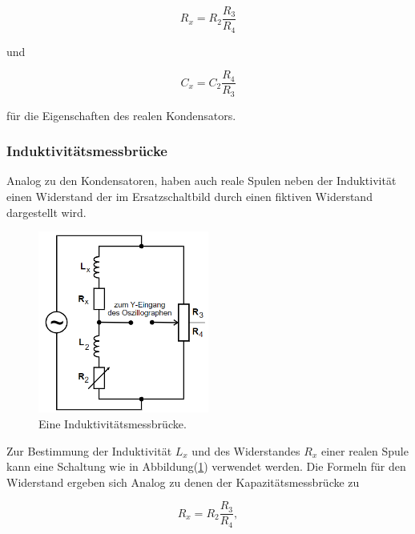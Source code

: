             \begin{equation*}
                R_x = R_2 \frac{R_3}{R_4}
            \end{equation*}

            \noindent und 

            \begin{equation*}
                C_x = C_2 \frac{R_4}{R_3}
            \end{equation*}

            \noindent für die Eigenschaften des realen Kondensators.

        \subsubsection{Induktivitätsmessbrücke}

            \noindent Analog zu den Kondensatoren, haben auch reale Spulen neben der Induktivität einen Widerstand der im Ersatzschaltbild durch 
            einen fiktiven Widerstand dargestellt wird. 

            \begin{figure}[ht]
                \centering
                \includegraphics[width=0.5\textwidth]{latex/images/Spule.PNG}
                \caption{Eine Induktivitätsmessbrücke\protect \cite{V302}.}
                \label{img:Spul}
            \end{figure}

            \noindent Zur Bestimmung der Induktivität $L_x$ und des Widerstandes $R_x$ einer realen Spule kann eine Schaltung wie in 
            Abbildung(\ref{img:Spul}) verwendet werden. Die Formeln für den Widerstand ergeben sich Analog zu denen der Kapazitätsmessbrücke zu 

            \begin{equation*}
                R_x = R_2 \frac{R_3}{R_4},
            \end{equation*}

